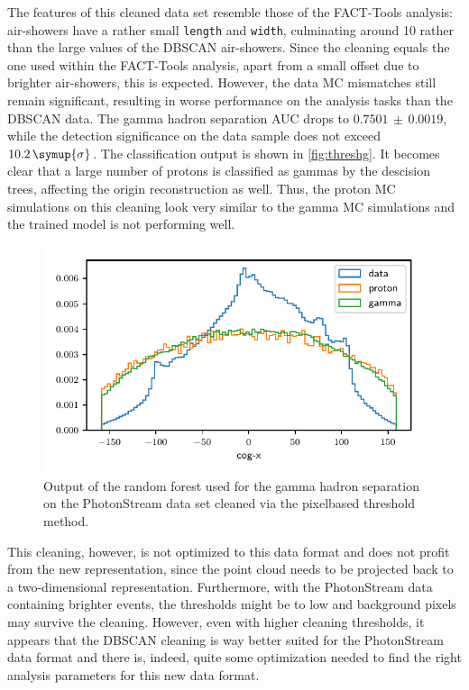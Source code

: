 The features of this cleaned data set resemble those of the FACT-Tools
analysis: air-showers have a rather small \texttt{length} and \texttt{width},
culminating around \num{10} rather than the large values of the DBSCAN
air-showers. Since the cleaning equals the one used within the FACT-Tools
analysis, apart from a small offset due to brighter air-showers, this is
expected. However, the data MC mismatches still remain significant, resulting
in worse performance on the analysis tasks than the DBSCAN data. The gamma
hadron separation AUC drops to $0.7501\,\pm\,0.0019$, while the detection
significance on the data sample does not exceed $10.2\,\symup{\sigma}$. The
classification output is shown in \autoref{fig:threshg}. It becomes clear that
a large number of protons is classified as gammas by the descision trees, affecting the origin reconstruction as well. Thus,
the proton MC simulations on this cleaning look very similar to the gamma MC
simulations and the trained model is not performing well.

\begin{figure}
  \centering
  \includegraphics[width=\textwidth, page=5]{Plots/data_mc/features_thresh.pdf}
  \caption{Output of the random forest used for the gamma hadron separation on the PhotonStream data set cleaned via the pixelbased threshold method.}
  \label{fig:threshg}
\end{figure}
%
This cleaning, however, is not optimized to this data format and does not
profit from the new representation, since the point cloud needs to be projected
back to a two-dimensional representation. Furthermore, with the PhotonStream
data containing brighter events, the thresholds might be to low and background
pixels may survive the cleaning. However, even with higher cleaning thresholds,
it appears that the DBSCAN cleaning is way better suited for the PhotonStream
data format and there is, indeed, quite some optimization needed to find the
right analysis parameters for this new data format.
